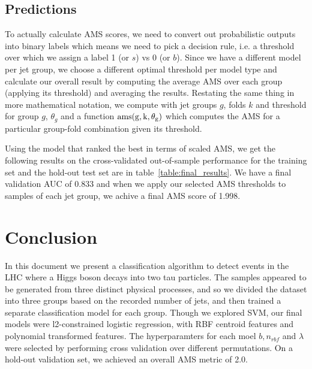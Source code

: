 \subsection{Predictions}
To actually calculate AMS scores, we need to convert out probabilistic outputs into binary labels which means we need to pick a decision rule, i.e. a threshold over which we assign a label 1 (or $s$) vs 0 (or $b$). Since we have a different model per jet group, we choose a different optimal threshold per model type and calculate our overall result by computing the average AMS over each group (applying its threshold) and averaging the results. Restating the same thing in more mathematical notation, we compute 
with jet groups $g$, folds $k$ and threshold for group $g$, $\theta_g$ and a function $\rm{ams}(g, k, \theta_g)$ which computes the AMS for a particular group-fold combination given its threshold.

Using the model that ranked the best in terms of scaled AMS, we get the following results on the cross-validated out-of-sample performance for the training set and the hold-out test set are in table~\ref{table:final_results}. We have a final validation AUC of 0.833 and when we apply our selected AMS thresholds to samples of each jet group, we achive a final AMS score of 1.998.



\section{Conclusion}
\label{conclusion}
In this document we present a classification algorithm to detect events in the LHC where a Higgs boson decays into two tau particles. The samples appeared to be generated from three distinct physical processes, and so we divided the dataset into three groups based on the recorded number of jets, and then trained a separate classification model for each group. Though we explored SVM, our final models were l2-constrained logistic regression, with RBF centroid features and polynomial transformed features. The hyperparamters for each moel $b, n_{rbf}$ and $\lambda$ were selected by performing cross validation over different permutations. On a hold-out validation set, we achieved an overall AMS metric of 2.0. 

\pagebreak 


{}


